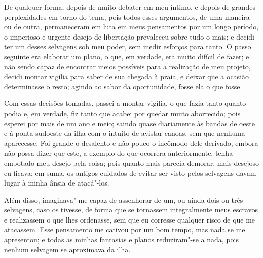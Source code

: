 De qualquer forma, depois de muito debater em meu íntimo, e depois de
grandes perplexidades em torno do tema, pois todos esses argumentos, de
uma maneira ou de outra, permaneceram em luta em meus pensamentos por um
longo período, o imperioso e urgente desejo de libertação prevaleceu
sobre tudo o mais; e decidi ter um desses selvagens sob meu poder, sem
medir esforços para tanto. O passo seguinte era elaborar um plano, o
que, em verdade, era muito difícil de fazer; e não sendo capaz de
encontrar meios possíveis para a realização de meu projeto, decidi
montar vigília para saber de sua chegada à praia, e deixar que a ocasião
determinasse o resto; agindo ao sabor da oportunidade, fosse ela o que
fosse.

Com essas decisões tomadas, passei a montar vigília, o que fazia tanto
quanto podia e, em verdade, fiz tanto que acabei por quedar muito
aborrecido; pois esperei por mais de um ano e meio; saindo quase
diariamente às bandas de oeste e à ponta sudoeste da ilha com o intuito
de avistar canoas, sem que nenhuma aparecesse. Foi grande o desalento e
não pouco o incômodo dele derivado, embora não possa dizer que este, a
exemplo do que ocorrera anteriormente, tenha embotado meu desejo pela
coisa; pois quanto mais parecia demorar, mais desejoso eu ficava; em
suma, os antigos cuidados de evitar ser visto pelos selvagens davam
lugar à minha ânsia de atacá"-los.

Além disso, imaginava"-me capaz de assenhorar de um, ou ainda dois ou
três selvagens, caso os tivesse, de forma que se tornassem integralmente
meus escravos e realizassem o que lhes ordenasse, sem que eu corresse
qualquer risco de que me atacassem. Esse pensamento me cativou por um
bom tempo, mas nada se me apresentou; e todas as minhas fantasias e
planos reduziram"-se a nada, pois nenhum selvagem se aproximava da ilha.

